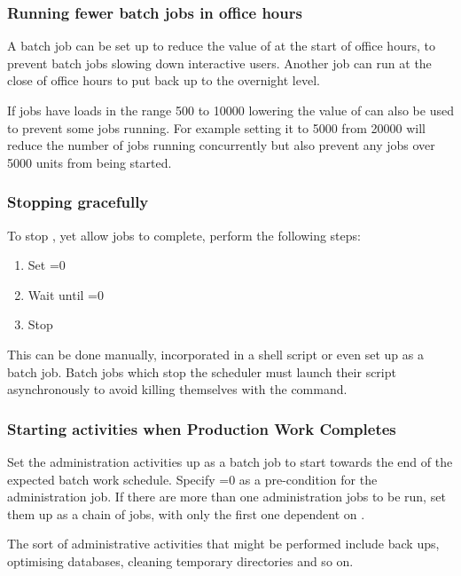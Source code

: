 \subsubsection{Running fewer batch jobs in office hours}
A batch job can be set up to reduce the value of  at the start of office hours, to prevent
batch jobs slowing down interactive users. Another job can run at the close of office hours to put  back up to
the overnight level.

If jobs have loads in the range 500 to 10000 lowering the value of  can also be used to prevent some jobs
running. For example setting it to 5000 from 20000 will reduce the number of jobs running concurrently but also prevent any jobs over 5000
units from being started.

\subsubsection{Stopping \manualProduct{} gracefully}
To stop \ProductName{}, yet allow jobs to complete, perform the following
steps:

\begin{enumerate}
\item Set =0
\item Wait until =0
\item Stop \ProductName{}
\end{enumerate}

This can be done manually, incorporated in a shell script or even set up as a batch job. Batch jobs which stop the scheduler must launch their script asynchronously to avoid killing themselves with the \PrBtquit{} command.

\subsubsection{Starting activities when Production Work Completes}
Set the administration activities up as a batch job to start towards the end of the expected batch work schedule. Specify
=0 as a pre-condition for the administration job. If there are more than one administration jobs to be run, set them
up as a chain of jobs, with only the first one dependent on .

The sort of administrative activities that might be performed include back ups, optimising databases, cleaning temporary directories and so
on.

